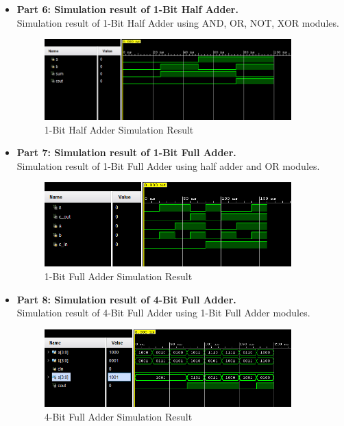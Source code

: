 \documentclass[pdftex,12pt,a4paper]{article}
\begin{document}
\begin{itemize}
    \item \textbf{Part 6: Simulation result of 1-Bit Half Adder.}\\
    Simulation result of 1-Bit Half Adder using AND, OR, NOT, XOR modules.
    \begin{figure}[H]
    \centering
        \includegraphics[width=0.9\textwidth]{halfadder.png}	
        \caption{1-Bit Half Adder Simulation Result}
        \label{fig1}
   \end{figure}
\end{itemize}
\newpage
\begin{itemize}
    \item \textbf{Part 7: Simulation result of 1-Bit Full Adder.}\\
    Simulation result of 1-Bit Full Adder using half adder and OR modules.
    \begin{figure}[H]
    \centering
        \includegraphics[width=0.9\textwidth]{fulladder.png}	
        \caption{1-Bit Full Adder Simulation Result}
        \label{fig1}
   \end{figure}
\end{itemize}
\begin{itemize}
    \item \textbf{Part 8: Simulation result of 4-Bit Full Adder.}\\
    Simulation result of 4-Bit Full Adder using 1-Bit Full Adder modules.
    \begin{figure}[H]
    \centering
        \includegraphics[width=0.9\textwidth]{fulladder4.png}	
        \caption{4-Bit Full Adder Simulation Result}
        \label{fig1}
   \end{figure}
\end{itemize}
\end{document}
